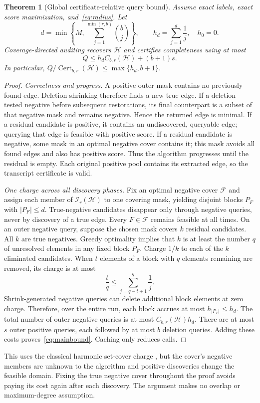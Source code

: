 \documentclass[10pt]{article}
\newtheorem{theorem}{Theorem}
\theoremstyle{definition}\newtheorem{definition}[theorem]{Definition}
\newcommand{\HH}{\mathcal H}
\newcommand{\II}{\mathcal I}
\newcommand{\FF}{\mathcal F}
\newcommand{\Cert}{\operatorname{Cert}}
\begin{document}
\begin{theorem}[Global certificate-relative query bound]\label{thm:greedy}
Assume exact labels, exact score maximization, and~\eqref{eq:radius}. Let
\begin{equation}
 d=\min\left\{M,\sum_{j=1}^{\min(r,b)}\binom bj\right\},\qquad
 h_d=\sum_{j=1}^d\frac1j,\quad h_0=0.
\end{equation}
Coverage-directed auditing recovers $\HH$ and certifies completeness using at most
\begin{equation}
 Q\le h_d C_{b,r}(\HH)+(b+1)s.
 \label{eq:mainbound}
\end{equation}
In particular, $Q/\Cert_{b,r}(\HH)\le\max\{h_d,b+1\}$.
\end{theorem}
\begin{proof}
\emph{Correctness and progress.} A positive outer mask contains no previously found
edge. Deletion shrinking therefore finds a new true edge. If a deletion tested
negative before subsequent restorations, its final counterpart is a subset of that
negative mask and remains negative. Hence the returned edge is minimal.
If a residual candidate is positive, it contains an undiscovered, queryable edge;
querying that edge is feasible with positive score. If a residual candidate is
negative, some mask in an optimal negative cover contains it; this mask avoids all
found edges and also has positive score. Thus the algorithm progresses until the
residual is empty. Each original positive pool contains its extracted edge, so the
transcript certificate is valid.

\emph{One charge across all discovery phases.} Fix an optimal negative cover $\FF$
and assign each member of $\II_r(\HH)$ to one covering mask, yielding disjoint blocks
$P_F$ with $|P_F|\le d$. True-negative candidates disappear only through negative
queries, never by discovery of a true edge. Every $F\in\FF$ remains feasible at
all times. On an outer negative query, suppose the chosen mask covers $k$ residual
candidates. All $k$ are true negatives. Greedy optimality implies that $k$ is at
least the number $q$ of unresolved elements in any fixed block $P_F$.
Charge $1/k$ to each of the $k$ eliminated candidates. When $t$ elements of a block
with $q$ elements remaining are removed, its charge is at most
\begin{equation}
 \frac tq\le\sum_{j=q-t+1}^{q}\frac1j.
\end{equation}
Shrink-generated negative queries can delete additional block elements at zero
charge. Therefore, over the entire run, each block accrues at most $h_{|P_F|}\le h_d$.
The total number of outer negative queries is at most $C_{b,r}(\HH)h_d$.
There are at most $s$ outer positive queries, each followed by at most $b$ deletion
queries. Adding these costs proves~\eqref{eq:mainbound}. Caching only reduces calls.
\end{proof}
This uses the classical harmonic set-cover charge \citep{chvatal1979}, but the
cover's negative members are unknown to the algorithm and positive discoveries
change the feasible domain. Fixing the true negative cover throughout the proof
avoids paying its cost again after each discovery. The argument makes no overlap
or maximum-degree assumption.
\end{document}

